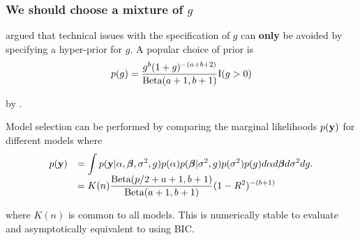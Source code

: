 \documentclass[notes=only]{beamer}
\begin{document}


\begin{frame}
	\frametitle{We should choose a mixture of $g$}
	\cite{Liang2008} argued that    
	technical issues with the specification of $g$ can {\bf only}
	be avoided by specifying a hyper-prior for $g$.
	A popular choice of prior is
	$$
	p(g) = \frac{g^b (1 + g)^{-(a + b + 2)}}{\text{Beta}(a + 1, b + 1)} \text{I}(g > 0)
	$$
	
	by \cite{Maruyama2011}.


Model selection can be performed by comparing the marginal likelihoods $p({\bf y})$ for different models where
$$
\begin{array}{rl}
p({\bf y}) 
& \displaystyle = \int p({\bf y}|\alpha,{\boldsymbol \beta},\sigma^2,g)p(\alpha)p({\boldsymbol \beta}|\sigma^2,g)p(\sigma^2)p(g) d\alpha d{\boldsymbol \beta} d\sigma^2 dg.
\\
& \displaystyle 
=  K(n)
\frac{\mbox{Beta}(p/2 + a + 1,b + 1)}{\mbox{Beta}(a+1,b+1)} (1 - R^2)^{-(b + 1)}
\end{array} 
$$

\noindent where $K(n)$ is common to all models.
This is numerically stable to evaluate
and asymptotically equivalent to using BIC.

\end{frame}
\end{document}
